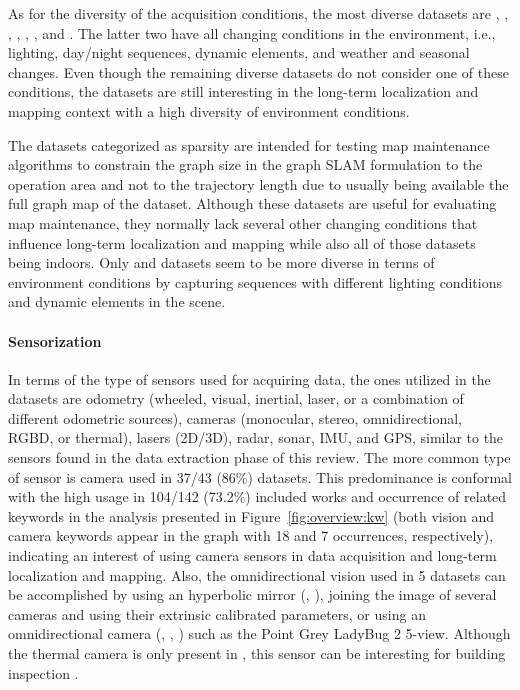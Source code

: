 As for the diversity of the acquisition conditions, the most diverse datasets are , , , , , , and . The latter two have all changing conditions in the environment, i.e., lighting, day/night sequences, dynamic elements, and weather and seasonal changes. Even though the remaining diverse datasets do not consider one of these conditions, the datasets are still interesting in the long-term localization and mapping context with a high diversity of environment conditions.

The datasets categorized as sparsity are intended for testing map maintenance algorithms to constrain the graph size in the graph SLAM formulation to the operation area and not to the trajectory length due to usually being available the full graph map of the dataset. Although these datasets are useful for evaluating map maintenance, they normally lack several other changing conditions that influence long-term localization and mapping while also all of those datasets being indoors. Only  and  datasets seem to be more diverse in terms of environment conditions by capturing sequences with different lighting conditions and dynamic elements in the scene.


\paragraph{Sensorization}

In terms of the type of sensors used for acquiring data, the ones utilized in the datasets are odometry (wheeled, visual, inertial, laser, or a combination of different odometric sources), cameras (monocular, stereo, omnidirectional, RGBD, or thermal), lasers (2D/3D), radar, sonar, IMU, and GPS, similar to the sensors found in the data extraction phase of this review. The more common type of sensor is camera used in 37/43 (86\%) datasets. This predominance is conformal with the high usage in 104/142 (73.2\%) included works and occurrence of related keywords in the analysis presented in Figure~\ref{fig:overview:kw} (both vision and camera keywords appear in the graph with 18 and 7 occurrences, respectively), indicating an interest of using camera sensors in data acquisition and long-term localization and mapping.
Also, the omnidirectional vision used in 5 datasets can be accomplished by using an hyperbolic mirror (, ), joining the image of several cameras and using their extrinsic calibrated parameters, or using an omnidirectional camera (, , ) such as the Point Grey LadyBug 2 5-view.
Although the thermal camera is only present in , this sensor can be interesting for building inspection \parencite{yue-et-al:2020:9197072}.

